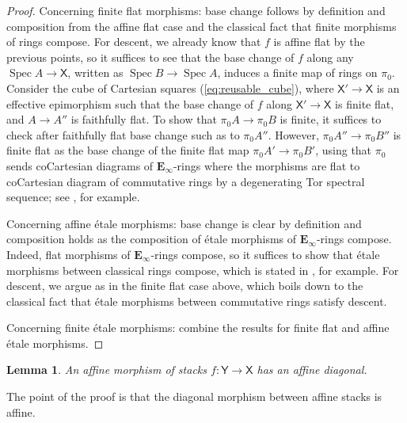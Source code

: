 \documentclass[11pt, a4paper]{article}
\DeclareMathOperator{\Spec}{Spec}
\newcommand{\1}{\mathbf{1}}
\newcommand{\E}{\mathbf{E}}
\newcommand{\X}{\mathsf{X}}
\newcommand{\Y}{\mathsf{Y}}
\theoremstyle{plain}
\newtheorem{lemma}[equation]{Lemma}
\theoremstyle{definition}
\theoremstyle{remark}\numberwithin{equation}{section}
\begin{document}
\begin{proof}
    Concerning finite flat morphisms: base change follows by definition and composition from the affine flat case and the classical fact that finite morphisms of rings compose. For descent, we already know that $f$ is affine flat by the previous points, so it suffices to see that the base change of $f$ along any $\Spec A \to \X$, written as $\Spec B \to \Spec A$, induces a finite map of rings on $\pi_0$. Consider the cube of Cartesian squares (\ref{eq:reusable_cube}), where $\X' \to \X$ is an effective epimorphism such that the base change of $f$ along $\X' \to \X$ is finite flat, and $A \to A''$ is faithfully flat. To show that $\pi_0 A \to \pi_0 B$ is finite, it suffices to check after faithfully flat base change \cite[\textsection C]{hortzwedhorn} such as to $\pi_0 A''$. However, $\pi_0 A'' \to \pi_0 B''$ is finite flat as the base change of the finite flat map $\pi_0 A' \to \pi_0 B'$, using that $\pi_0$ sends coCartesian diagrams of $\E_\infty$-rings where the morphisms are flat to coCartesian diagram of commutative rings by a degenerating Tor spectral sequence; see \cite[Lm.3.4.3.1]{reconstruction}, for example.

    Concerning affine étale morphisms: base change is clear by definition and composition holds as the composition of étale morphisms of $\E_\infty$-rings compose. Indeed, flat morphisms of $\E_\infty$-rings compose, so it suffices to show that étale morphisms between classical rings compose, which is stated in \cite[\textsection C]{hortzwedhorn}, for example. For descent, we argue as in the finite flat case above, which boils down to the classical fact that étale morphisms between commutative rings satisfy descent.

    Concerning finite étale morphisms: combine the results for finite flat and affine étale morphisms.
\end{proof}

\begin{lemma}\label{lm:affine_has_affine_diagonal}
    An affine morphism of stacks $f\colon \Y \to \X$ has an affine diagonal.
\end{lemma}

The point of the proof is that the diagonal morphism between affine stacks is affine.
\end{document}
